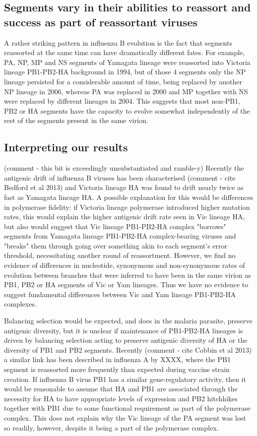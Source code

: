 \documentclass[11pt,oneside,letterpaper]{article}
\begin{document}
\subsection*{Segments vary in their abilities to reassort and success as part of reassortant viruses}
A rather striking pattern in influenza B evolution is the fact that segments reassorted at the same time can have dramatically different fates.
For example, PA, NP, MP and NS segments of Yamagata lineage were reassorted into Victoria lineage PB1-PB2-HA background in 1994, but of those 4 segments only the NP lineage persisted for a considerable amount of time, being replaced by another NP lineage in 2006, whereas PA was replaced in 2000 and MP together with NS were replaced by different lineages in 2004.
This suggests that most non-PB1, PB2 or HA segments have the capacity to evolve somewhat independently of the rest of the segments present in the same virion.

\subsection*{Interpreting our results}
(comment - this bit is exceedingly unsubstantiated and ramble-y)
Recently the antigenic drift of influenza B viruses has been characterised (comment - cite Bedford et al 2013) and Victoria lineage HA was found to drift nearly twice as fast as Yamagata lineage HA.
A possible explanation for this would be differences in polymerase fidelity: if Victoria lineage polymerase introduced higher mutation rates, this would explain the higher antigenic drift rate seen in Vic lineage HA, but also would suggest that Vic lineage PB1-PB2-HA complex "borrows" segments from Yamagata lineage PB1-PB2-HA complex-bearing viruses and "breaks" them through going over something akin to each segment's error threshold, necessitating another round of reassortment.
However, we find no evidence of differences in nucleotide, synonymous and non-synonymous rates of evolution between branches that were inferred to have been in the same virion as PB1, PB2 or HA segments of Vic or Yam lineages.
Thus we have no evidence to suggest fundamental differences between Vic and Yam lineage PB1-PB2-HA complexes.

Balancing selection would be expected, and does in the malaria parasite, preserve antigenic diversity, but it is unclear if maintenance of PB1-PB2-HA lineages is driven by balancing selection acting to preserve antigenic diversity of HA or the diversity of PB1 and PB2 segments.
Recently (comment - cite Cobbin et al 2013) a similar link has been described in influenza A by XXXX, where the PB1 segment is reassorted more frequently than expected during vaccine strain creation.
If influenza B virus PB1 has a similar gene-regulatory activity, then it would be reasonable to assume that HA and PB1 are associated through the necessity for HA to have appropriate levels of expression and PB2 hitchhikes together with PB1 due to some functional requirement as part of the polymerase complex.
This does not explain why the Vic lineage of the PA segment was lost so readily, however, despite it being a part of the polymerase complex.
\end{document}
